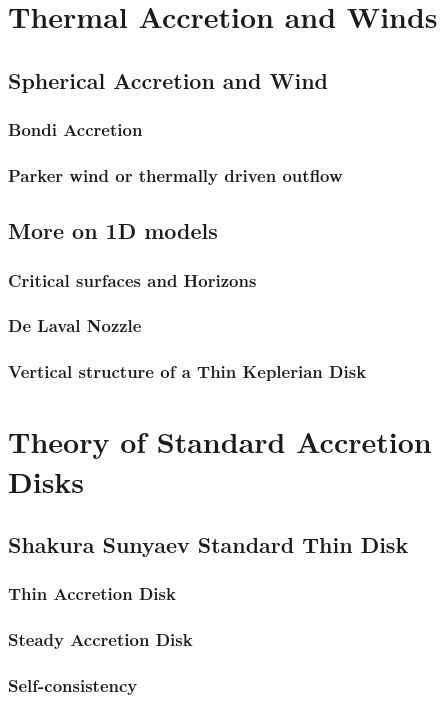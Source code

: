 \documentclass[10pt,a4paper]{article}
\begin{document}
\section{Thermal Accretion and Winds}
\subsection{Spherical Accretion and Wind}
\subsubsection{Bondi Accretion}
\subsubsection{Parker wind or thermally driven outflow}
\subsection{More on 1D models}
\subsubsection{Critical surfaces and Horizons}
\subsubsection{De Laval Nozzle}
\subsubsection{Vertical structure of a Thin Keplerian Disk}

\section{Theory of Standard Accretion Disks}
\subsection{Shakura Sunyaev Standard Thin Disk}
\subsubsection{Thin Accretion Disk}
\subsubsection{Steady Accretion Disk}
\subsubsection{Self-consistency}
\end{document}
